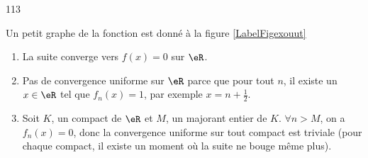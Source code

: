 

\begin{corrige}{113}

Un petit graphe de la fonction est donné à la figure \ref{LabelFigexouut}
\newcommand{\CaptionFigexouut}{Le graphe de la fonction $f_n$.}


\begin{enumerate}
\item La suite converge vers $f(x)=0$ sur $\eR$.
\item Pas de convergence uniforme sur $\eR$ parce que pour tout $n$, il existe un $x\in\eR$ tel que $f_n(x)=1$, par exemple $x=n+\frac{ 1 }{2}$.
\item Soit $K$, un compact de $\eR$ et $M$, un majorant entier de $K$. $\forall n>M$, on a $f_n(x)=0$, donc la convergence uniforme sur tout compact est triviale (pour chaque compact, il existe un moment où la suite ne bouge même plus).
\end{enumerate}

\end{corrige}
